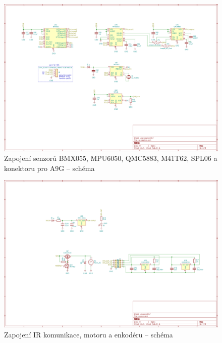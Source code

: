 \begin{figure}
    \centering
    \includegraphics[width=0.93\textheight, angle=90]{kapitoly/ctvrta_elektronicka_varianta/E4_zapojeni/senzorika.png}
    \caption{Zapojení senzorů BMX055, MPU6050, QMC5883, M41T62, SPL06 a konektoru pro A9G -- schéma \centering}
    \label{fig:E4-sch_senzorika}
\end{figure}
\begin{figure}
    \centering
    \includegraphics[width=0.93\textheight, angle=90]{kapitoly/ctvrta_elektronicka_varianta/E4_zapojeni/IR_motor_enkoder.png}
    \caption{Zapojení IR komunikace, motoru a enkodéru -- schéma}
    \label{fig:E4-sch_IR-Motor-enkoder}
\end{figure}
